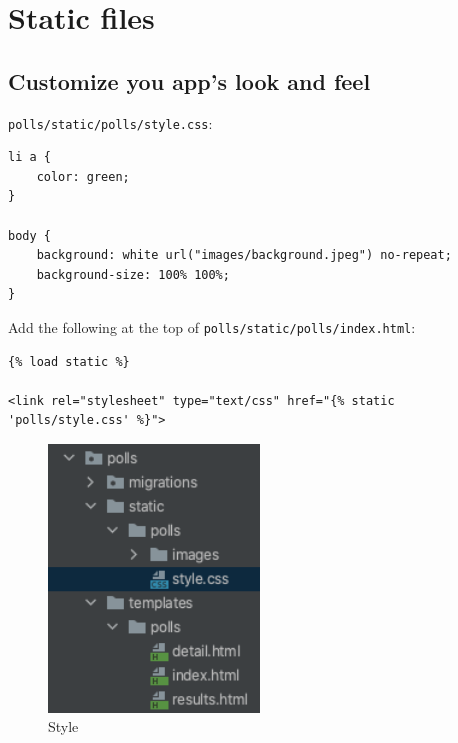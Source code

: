 
\chapter{Static files}

\section{Customize you app's look and feel}

\verb|polls/static/polls/style.css|:
\begin{lstlisting}
li a {
    color: green;
}

body {
    background: white url("images/background.jpeg") no-repeat;
    background-size: 100% 100%;
}
\end{lstlisting}

Add the following at the top of \verb|polls/static/polls/index.html|:
\begin{lstlisting}
{% load static %}

<link rel="stylesheet" type="text/css" href="{% static 'polls/style.css' %}">
\end{lstlisting}


\begin{figure}[H]
  \centering
  \includegraphics[width=0.5\textwidth]{style.png}
  \caption{Style}
  \label{fig:style}
\end{figure}


